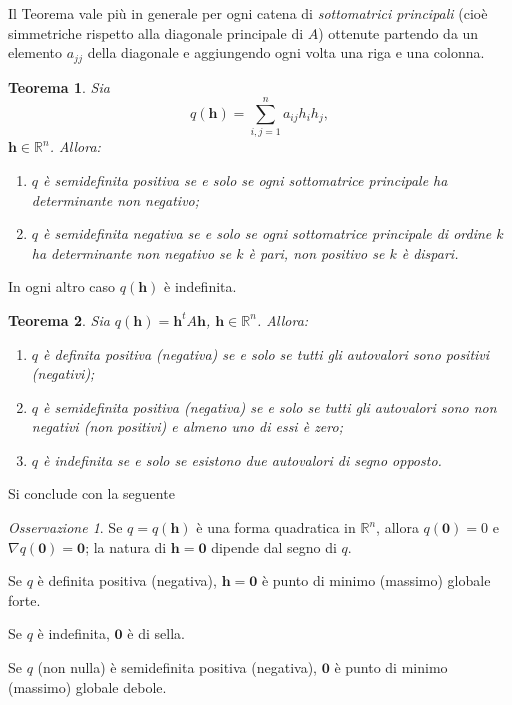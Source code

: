 \documentclass[a4paper]{book}
\numberwithin{equation}{section}
\theoremstyle{plain}
\newtheorem{teor}{Teorema}[section]
\theoremstyle{definition}
\theoremstyle{remark}
\newtheorem{oss}{Osservazione}[section]
\renewcommand{\vec}{\boldsymbol}
\theoremstyle{example}
\begin{document}
	Il Teorema vale più in generale per ogni catena di \emph{sottomatrici principali} (cioè simmetriche rispetto alla diagonale principale di $A$) ottenute partendo da un elemento $a_{jj}$ della diagonale e aggiungendo ogni volta una riga e una colonna.

	\begin{teor}
		Sia
		\begin{equation*}
			q(\vec{h}) = \sum_{i,j = 1}^na_{ij}h_ih_j,
		\end{equation*}
		$\vec{h} \in \mathbb{R}^n$. Allora:
		\begin{enumerate}
			\item $q$ è semidefinita positiva se e solo se ogni sottomatrice principale ha determinante non negativo;
			\item $q$ è semidefinita negativa se e solo se ogni sottomatrice principale di ordine $k$ ha determinante non negativo se $k$ è pari, non positivo se $k$ è dispari.
		\end{enumerate}
	\end{teor}
	In ogni altro caso $q(\vec{h})$ è indefinita.

	\begin{teor}
		Sia $q(\vec{h}) = \vec{h}^tA\vec{h}$, $\vec{h} \in \mathbb{R}^n$. Allora:
		\begin{enumerate}
			\item $q$ è definita positiva (negativa) se e solo se tutti gli autovalori sono positivi (negativi);
			\item $q$ è semidefinita positiva (negativa) se e solo se tutti gli autovalori sono non negativi (non positivi) e almeno uno di essi è zero;
			\item $q$ è indefinita se e solo se esistono due autovalori di segno opposto.
		\end{enumerate}
	\end{teor}

	Si conclude con la seguente
	\begin{oss}
		Se $q = q(\vec{h})$ è una forma quadratica in $\mathbb{R}^n$, allora $q(\vec{0}) = 0$ e $\nabla q(\vec{0}) = \vec{0}$; la natura di $\vec{h} = \vec{0}$ dipende dal segno di $q$.

		Se $q$ è definita positiva (negativa), $\vec{h} = \vec{0}$ è punto di minimo (massimo) globale forte.

		Se $q$ è indefinita, $\vec{0}$ è di sella.

		Se $q$ (non nulla) è semidefinita positiva (negativa), $\vec{0}$ è punto di minimo (massimo) globale debole.
	\end{oss}
\end{document}
